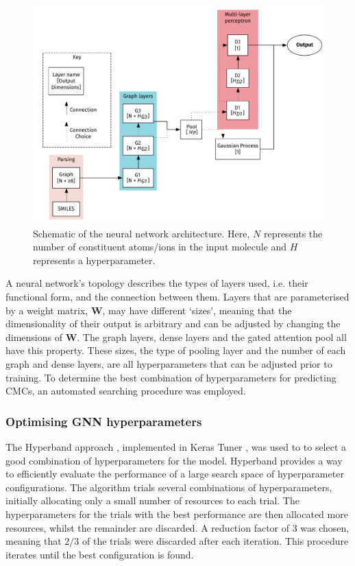\begin{figure}
    \centering
    \includegraphics[width=\textwidth]{images/model_graph.pdf}
    \caption{Schematic of the neural network architecture. Here, $N$ represents the number of constituent atoms/ions in the input molecule and $H$ represents a hyperparameter.}
    \label{fig:model-topology}
\end{figure}

A neural network's topology describes the types of layers used, i.e. their
functional form, and the connection between them. Layers that are parameterised
by a weight matrix, $\mathbf{W}$, may have different `sizes', meaning that the
dimensionality of their output is arbitrary and can be adjusted by changing the
dimensions of $\mathbf{W}$. The graph layers, dense layers and the gated
attention pool all have this property. These sizes, the type of pooling layer
and the number of each graph and dense layers, are all hyperparameters that can
be adjusted prior to training. To determine the best combination of
hyperparameters for predicting CMCs, an automated searching procedure was
employed.

\subsubsection{Optimising GNN hyperparameters}

The Hyperband approach \cite{liHyperbandNovelBanditBased2018}, implemented in
Keras Tuner \cite{cholletKeras2015}, was used to to select a good combination of
hyperparameters for the model. Hyperband provides a way to efficiently evaluate
the performance of a large search space of hyperparameter configurations. The
algorithm trials several combinations of hyperparameters, initially allocating
only a small number of resources to each trial. The hyperparameters for the
trials with the best performance are then allocated more resources, whilst the
remainder are discarded. A reduction factor of 3 was chosen, meaning that $2/3$
of the trials were discarded after each iteration. This procedure iterates until
the best configuration is found.

